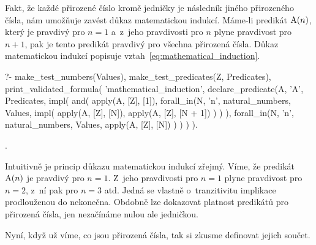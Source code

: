 Fakt, že každé přirozené číslo kromě jedničky je následník jiného přirozeného čísla, nám umožňuje zavést důkaz matematickou indukcí. Máme-li predikát \(\mathrm{A}(n)\), který je pravdivý pro \(n=1\) a~z~jeho pravdivosti pro \(n\) plyne  pravdivost pro \(n + 1\), pak je tento predikát pravdivý pro všechna přirozená čísla. Důkaz matematickou
indukcí popisuje vztah~\eqref{eq:mathematical_induction}.

\begin{prolog}
?-	make_test_numbers(Values),
	make_test_predicates(Z, Predicates),
	print_validated_formula(
		'mathematical_induction',
		declare_predicate(A, 'A', Predicates,
			impl(			
				and(
					apply(A, [Z], [1]),
					forall_in(N, 'n', natural_numbers, Values,
						impl(
							apply(A, [Z], [N]),
							apply(A, [Z], [N + 1])
						)
					)
				),
				forall_in(N, 'n', natural_numbers, Values,
					apply(A, [Z], [N])
				)
			)
		)
	).
\end{prolog}
.

Intuitivně je princip důkazu matematickou indukcí zřejmý. Víme, že predikát \(\mathrm{A}(n)\) je pravdivý pro \(n=1\). Z~jeho pravdivosti pro \(n=1\) plyne pravdivost pro \(n=2\), z~ní pak pro \(n=3\) atd. Jedná se vlastně o~tranzitivitu implikace prodlouženou do nekonečna. Obdobně lze dokazovat platnost predikátů pro přirozená čísla, jen nezačínáme nulou ale jedničkou.

Nyní, když už víme, co jsou přirozená čísla, tak si zkusme definovat jejich součet. 
